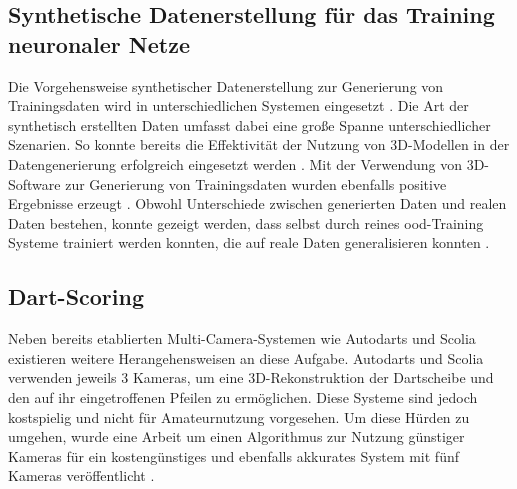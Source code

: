 
\subsection{Synthetische Datenerstellung für das Training neuronaler Netze}

Die Vorgehensweise synthetischer Datenerstellung zur Generierung von Trainingsdaten wird in unterschiedlichen Systemen eingesetzt \cite{synth_data}. Die Art der synthetisch erstellten Daten umfasst dabei eine große Spanne unterschiedlicher Szenarien. So konnte bereits die Effektivität der Nutzung von 3D-Modellen in der Datengenerierung erfolgreich eingesetzt werden \cite{synth_data_procedural,synth_data_cars_with_cam_aug,synth_data_pose_estimation}. Mit der Verwendung von 3D-Software zur Generierung von Trainingsdaten wurden ebenfalls positive Ergebnisse erzeugt \cite{synth_data_blender_defects,data_gen_importance,synth_data_importance_2}. Obwohl Unterschiede zwischen generierten Daten und realen Daten bestehen, konnte gezeigt werden, dass selbst durch reines \ac{ood}-Training Systeme trainiert werden konnten, die auf reale Daten generalisieren konnten \cite{ood_simulated_training}.


\subsection{Dart-Scoring}

Neben bereits etablierten Multi-Camera-Systemen wie Autodarts und Scolia \cite{autodarts,scoliadarts} existieren weitere Herangehensweisen an diese Aufgabe. Autodarts und Scolia verwenden jeweils 3 Kameras, um eine 3D-Rekonstruktion der Dartscheibe und den auf ihr eingetroffenen Pfeilen zu ermöglichen. Diese Systeme sind jedoch kostspielig und nicht für Amateurnutzung vorgesehen. Um diese Hürden zu umgehen, wurde eine Arbeit um einen Algorithmus zur Nutzung günstiger Kameras für ein kostengünstiges und ebenfalls akkurates System mit fünf Kameras veröffentlicht \cite{dart_scoring_multicam}.

